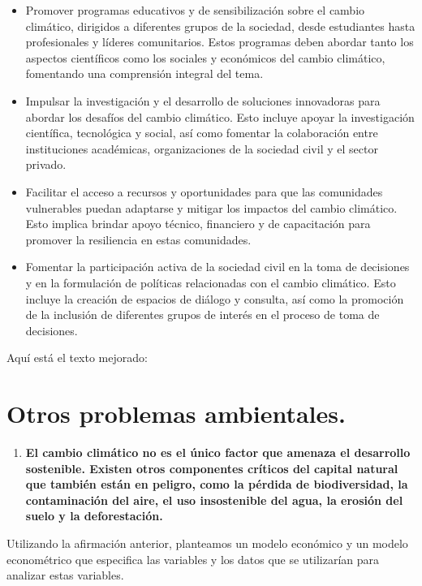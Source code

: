 \documentclass[
  stu,
  floatsintext,
  longtable,
  a4paper,
  nolmodern,
  notxfonts,
  notimes,
  12pt,
  colorlinks=true,linkcolor=blue,citecolor=blue,urlcolor=blue]{apa7}
\providecommand{\tightlist}{%
  \setlength{\itemsep}{0pt}\setlength{\parskip}{0pt}}
\begin{document}
\begin{itemize}
\tightlist
\item
  Promover programas educativos y de sensibilización sobre el cambio
  climático, dirigidos a diferentes grupos de la sociedad, desde
  estudiantes hasta profesionales y líderes comunitarios. Estos
  programas deben abordar tanto los aspectos científicos como los
  sociales y económicos del cambio climático, fomentando una comprensión
  integral del tema.
\item
  Impulsar la investigación y el desarrollo de soluciones innovadoras
  para abordar los desafíos del cambio climático. Esto incluye apoyar la
  investigación científica, tecnológica y social, así como fomentar la
  colaboración entre instituciones académicas, organizaciones de la
  sociedad civil y el sector privado.
\item
  Facilitar el acceso a recursos y oportunidades para que las
  comunidades vulnerables puedan adaptarse y mitigar los impactos del
  cambio climático. Esto implica brindar apoyo técnico, financiero y de
  capacitación para promover la resiliencia en estas comunidades.
\item
  Fomentar la participación activa de la sociedad civil en la toma de
  decisiones y en la formulación de políticas relacionadas con el cambio
  climático. Esto incluye la creación de espacios de diálogo y consulta,
  así como la promoción de la inclusión de diferentes grupos de interés
  en el proceso de toma de decisiones.
\end{itemize}

Aquí está el texto mejorado:

\section{Otros problemas
ambientales.}\label{otros-problemas-ambientales.}

\begin{enumerate}
\def\labelenumi{\alph{enumi}.}
\tightlist
\item
  \textbf{El cambio climático no es el único factor que amenaza el
  desarrollo sostenible. Existen otros componentes críticos del capital
  natural que también están en peligro, como la pérdida de
  biodiversidad, la contaminación del aire, el uso insostenible del
  agua, la erosión del suelo y la deforestación.}
\end{enumerate}

Utilizando la afirmación anterior, planteamos un modelo económico y un
modelo econométrico que especifica las variables y los datos que se
utilizarían para analizar estas variables.
\end{document}
